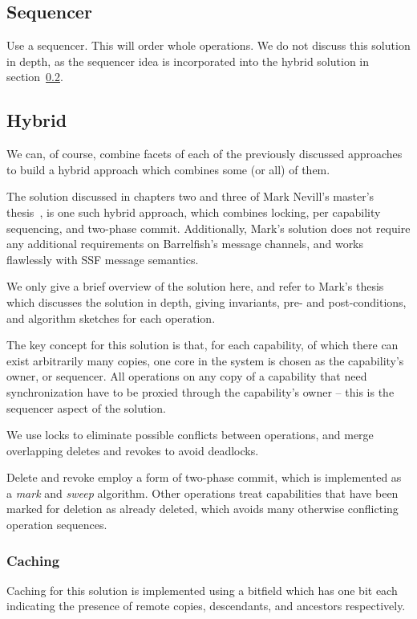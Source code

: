 \documentclass[a4paper,twoside]{report} %
\begin{document}
\subsection{Sequencer}
Use a sequencer. This will order whole operations. We do not discuss this
solution in depth, as the sequencer idea is incorporated into the hybrid
solution in section~\ref{sec:sol:hybrid}.

\subsection{Hybrid}
\label{sec:sol:hybrid}

We can, of course, combine facets of each of the previously discussed
approaches to build a hybrid approach which combines some (or all) of them.

The solution discussed in chapters two and three of Mark Nevill's master's
thesis~\cite{Nevill2012}, is one such hybrid approach, which combines locking,
per capability sequencing, and two-phase commit.
Additionally, Mark's solution does not require any additional requirements on
Barrelfish's message channels, and works flawlessly with SSF message
semantics.

We only give a brief overview of the solution here, and refer to Mark's thesis
which discusses the solution in depth, giving invariants, pre- and
post-conditions, and algorithm sketches for each operation.

The key concept for this solution is that, for each capability, of which there
can exist arbitrarily many copies, one core in the system is chosen as the
capability's owner, or sequencer.
All operations on any copy of a capability that need synchronization have to
be proxied through the capability's owner -- this is the sequencer aspect of
the solution.

We use locks to eliminate possible conflicts between operations, and merge
overlapping deletes and revokes to avoid deadlocks.

Delete and revoke employ a form of two-phase commit, which is implemented as a
\emph{mark} and \emph{sweep} algorithm.
Other operations treat capabilities that have been marked for deletion as
already deleted, which avoids many otherwise conflicting operation sequences.

\subsubsection{Caching}
Caching for this solution is implemented using a bitfield which has one bit
each indicating the presence of remote copies, descendants, and ancestors
respectively.
\end{document}
